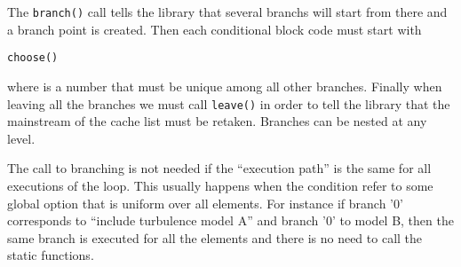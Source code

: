 The \verb+branch()+ call tells the library that several branchs will
start from there and a branch point is created. Then each conditional
block code must start with
\begin{alltt}choose()\end{alltt} where  is a number that
must be unique among all other branches. Finally when leaving all the
branches we must call \verb+leave()+ in order to tell the library that
the mainstream of the cache list must be retaken. 
Branches can be nested at any level. 

The call to branching is not needed if the ``execution path'' is the
same for all executions of the loop.  This usually happens when the
condition refer to some global option that is uniform over all
elements.  For instance if branch '0' corresponds to ``include
turbulence model A'' and branch '0' to model B, then the same branch
is executed for all the elements and there is no need to call the
static functions.

\label{sec:loop}  

